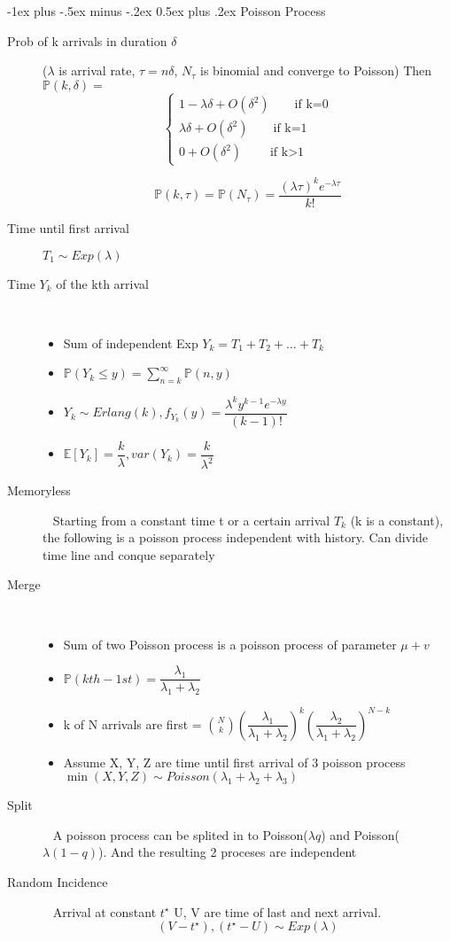\documentclass[a4paper, 10pt,landscape]{article}
\makeatletter
\renewcommand{\section}{\@startsection{section}{1}{0mm}%
                                {-1ex plus -.5ex minus -.2ex}%
                                {0.5ex plus .2ex}%
                                {\normalfont\large\bfseries}}
\makeatother
\begin{document}
\begin{multicols*}{4}
\section{Poisson Process}
\begin{description}
	\item[Prob of k arrivals in duration $\delta$] ($\lambda$ is arrival rate, $\tau = n \delta$, $N_{\tau}$ is binomial and converge to Poisson) Then $\mathbb{P}(k, \delta)=$
		$$\begin{cases}
				1 - \lambda \delta + O(\delta^2) \qquad\text{if k=0}\\[10pt]
				\lambda \delta + O(\delta^2)\qquad \text{if k=1}\\[10pt]
				0 + O(\delta^2) \qquad \text{if k$>$1}
		\end{cases}$$

		$$\mathbb{P}(k,\tau) = \mathbb{P}(N_{\tau}) = \dfrac{(\lambda \tau)^k e^{-\lambda \tau}}{k!}$$

	\item[Time until first arrival] $T_1 \sim Exp(\lambda)$

	\item[Time $Y_k$ of the kth arrival]~
		\begin{itemize}
			\item Sum of independent Exp $Y_k = T_1 + T_2 + ... + T_k$
			\item $\mathbb{P}(Y_k \leq y) = \sum_{n=k}^{\infty}\mathbb{P}(n, y)$
			\item $Y_k \sim Erlang(k),  f_{Y_k}(y) = \dfrac{\lambda^k y^{k-1} e^{-\lambda y} }{(k-1)!}$
			\item $\mathbb{E}[Y_k] = \dfrac{k}{\lambda}, var(Y_k)=\dfrac{k}{\lambda^2}$
		\end{itemize}
	\item[Memoryless]~
		Starting from a constant time t or a certain arrival $T_k$ (k is a constant), the following is a poisson process independent with history. Can divide time line and conque separately
	\item[Merge]~
		\begin{itemize}
			\item Sum of two Poisson process is a poisson process of parameter $\mu + v$
			\item $\mathbb{P}(kth - 1st) = \dfrac{\lambda_1}{\lambda_1 + \lambda_2}$
			\item k of N arrivals are first = $\binom{N}{k}(\dfrac{\lambda_1}{\lambda_1 + \lambda_2})^k (\dfrac{\lambda_2}{\lambda_1 + \lambda_2})^{N-k}$
			\item Assume X, Y, Z are time until first arrival of 3 poisson process $\min(X, Y, Z) \sim Poisson(\lambda_1 + \lambda_2 + \lambda_3)$
		\end{itemize}
	\item[Split]~
		A poisson process can be splited in to Poisson($\lambda q$) and Poisson($\lambda (1-q)$). And the resulting 2 proceses are independent
	\item[Random Incidence]~ 
		Arrival at constant $t^{\star}$ U, V are time of last and next arrival.
		$$(V - t^{\star}) , (t^{\star} - U) \sim Exp(\lambda)$$
\end{description}



\end{multicols*}
\end{document}
